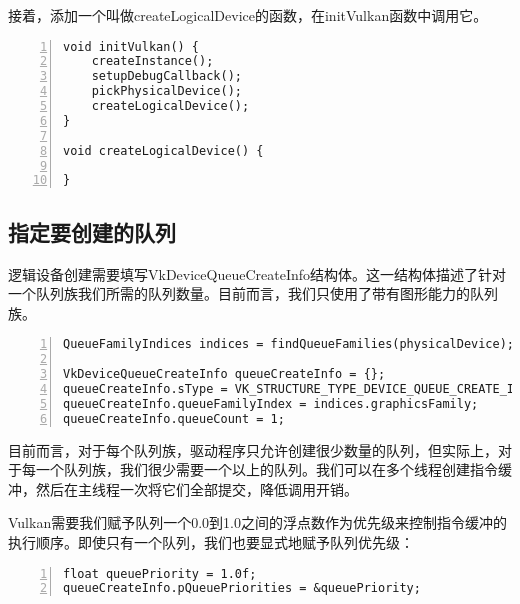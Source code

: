 \documentclass{ctexart}
\begin{document}
接着，添加一个叫做createLogicalDevice的函数，在initVulkan函数中调用它。

\begin{lstlisting}[language={[ANSI]C},keywordstyle=\color{blue!70},commentstyle=\color{red!50!green!50!blue!50},frame=shadowbox, rulesepcolor=\color{red!20!green!20!blue!20},basicstyle=\small,numbers=left, numberstyle=\tiny,breaklines=true]
void initVulkan() {
	createInstance();
	setupDebugCallback();
	pickPhysicalDevice();
	createLogicalDevice();
}

void createLogicalDevice() {

}
\end{lstlisting}

\subsection{指定要创建的队列}

逻辑设备创建需要填写VkDeviceQueueCreateInfo结构体。这一结构体描述了针对一个队列族我们所需的队列数量。目前而言，我们只使用了带有图形能力的队列族。

\begin{lstlisting}[language={[ANSI]C},keywordstyle=\color{blue!70},commentstyle=\color{red!50!green!50!blue!50},frame=shadowbox, rulesepcolor=\color{red!20!green!20!blue!20},basicstyle=\small,numbers=left, numberstyle=\tiny,breaklines=true]
QueueFamilyIndices indices = findQueueFamilies(physicalDevice);

VkDeviceQueueCreateInfo queueCreateInfo = {};
queueCreateInfo.sType = VK_STRUCTURE_TYPE_DEVICE_QUEUE_CREATE_INFO;
queueCreateInfo.queueFamilyIndex = indices.graphicsFamily;
queueCreateInfo.queueCount = 1;
\end{lstlisting}

目前而言，对于每个队列族，驱动程序只允许创建很少数量的队列，但实际上，对于每一个队列族，我们很少需要一个以上的队列。我们可以在多个线程创建指令缓冲，然后在主线程一次将它们全部提交，降低调用开销。

Vulkan需要我们赋予队列一个0.0到1.0之间的浮点数作为优先级来控制指令缓冲的执行顺序。即使只有一个队列，我们也要显式地赋予队列优先级：

\begin{lstlisting}[language={[ANSI]C},keywordstyle=\color{blue!70},commentstyle=\color{red!50!green!50!blue!50},frame=shadowbox, rulesepcolor=\color{red!20!green!20!blue!20},basicstyle=\small,numbers=left, numberstyle=\tiny,breaklines=true]
float queuePriority = 1.0f;
queueCreateInfo.pQueuePriorities = &queuePriority;
\end{lstlisting}
\end{document}

